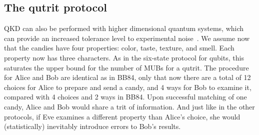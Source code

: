 \documentclass{article}
\begin{document}
\subsection{The qutrit protocol}
QKD can also be performed with higher dimensional quantum systems, which can provide an increased tolerance level to experimental noise~\cite{bechmann2000quantum}.
We assume now that the candies have four properties: color, taste, texture, and smell.
Each property now has three characters.
As in the six-state protocol for qubits, this saturates the upper bound for the number of MUBs for a qutrit.
The procedure for Alice and Bob are identical as in BB84, only that now there are a total of 12 choices for Alice to prepare and send a candy, and 4 ways for Bob to examine it, compared with 4 choices and 2 ways in BB84.
Upon successful matching of one candy, Alice and Bob would share a trit of information.
And just like in the other protocols, if Eve examines a different property than Alice's choice, she would (statistically) inevitably introduce errors to Bob's results.
\end{document}
